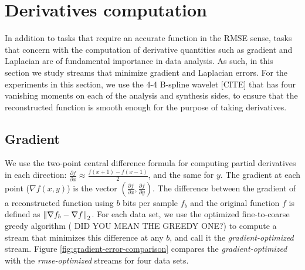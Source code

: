 \section{Derivatives computation}

In addition to tasks that require an accurate function in the RMSE sense, tasks that concern with
the computation of derivative quantities such as gradient and Laplacian are of fundamental
importance in data analysis. As such, in this section we study streams that minimize gradient and
Laplacian errors. For the experiments in this section, we use the 4-4 B-spline wavelet [CITE] that
has four vanishing moments on each of the analysis and synthesis sides, to ensure that the
reconstructed function is smooth enough for the purpose of taking derivatives.

\subsection{Gradient}

We use the two-point central difference formula for computing partial derivatives in each
direction: $\frac{\partial f}{\partial x}\approx \frac{f(x+1)-f(x-1)}{2}$, and the same for $y$. The
gradient at each point ($\nabla f(x,y)$) is the vector $(\frac{\partial f}{\partial
x},\frac{\partial f}{\partial y})$. The difference between the gradient of a reconstructed function
using $b$ bits per sample $f_b$ and the original function $f$ is defined as $\left\lVert\nabla f_b-\nabla
f\right\rVert_2$. For each data set, we use the optimized fine-to-coarse greedy algorithm ( DID YOU MEAN THE GREEDY ONE?) to compute a stream that minimizes this difference
at any $b$, and call it the \emph{gradient-optimized} stream. Figure
\ref{fig:gradient-error-comparison} compares the \emph{gradient-optimized} with the
\emph{rmse-optimized} streams for four data sets.

